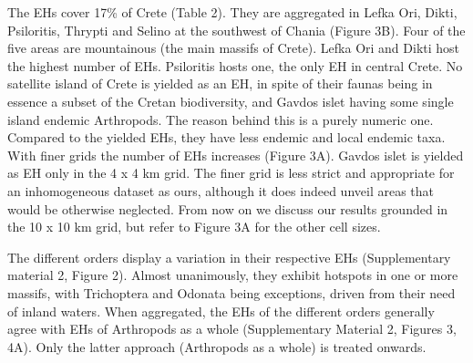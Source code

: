 The EHs cover 17\% of Crete (Table 2). They are aggregated in Lefka Ori, Dikti,
Psiloritis, Thrypti and Selino at the southwest of Chania (Figure 3B).
Four of the five areas are mountainous (the main massifs of Crete). Lefka Ori
and Dikti host the highest number of EHs. Psiloritis hosts one, the only EH in
central Crete. No satellite island of Crete is yielded as an EH, in spite of
their faunas being in essence a subset of the Cretan biodiversity, and Gavdos
islet having some single island endemic Arthropods. The reason behind this is a
purely numeric one. Compared to the yielded EHs, they have less endemic and local
endemic taxa. With finer grids the number of EHs increases (Figure 3A). Gavdos
islet is yielded as EH only in the 4 x 4 km grid. The finer grid is less strict
and appropriate for an inhomogeneous dataset as ours, although it does indeed
unveil areas that would be otherwise neglected. From now on we discuss our
results grounded in the 10 x 10 km grid, but refer to Figure 3A for the other
cell sizes.

The different orders display a variation in their respective EHs (Supplementary material 2, Figure 2).
Almost unanimously, they exhibit hotspots in one or more massifs,
with Trichoptera and Odonata being exceptions, driven from their need of inland waters.
When aggregated, the EHs of the different orders generally agree with EHs of
Arthropods as a whole (Supplementary Material 2, Figures 3, 4A). Only the
latter approach (Arthropods as a whole) is treated onwards.

